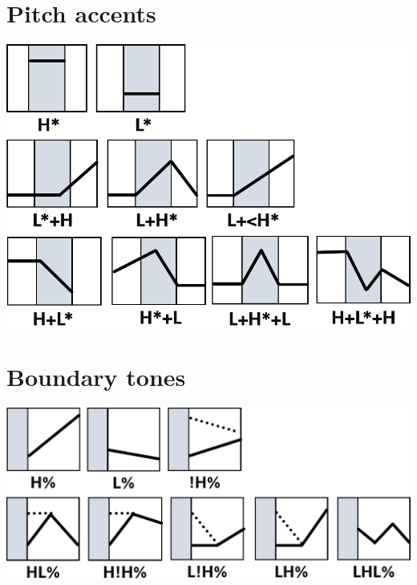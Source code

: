 \section{Pitch accents}\label{app:b1}


\includegraphics[width=.6\textwidth]{figures/a08HabilAppendix-img002.pdf}


\section{Boundary tones}\label{app:b2}

\includegraphics[width=.6\textwidth]{figures/a08HabilAppendix-img003.pdf}
